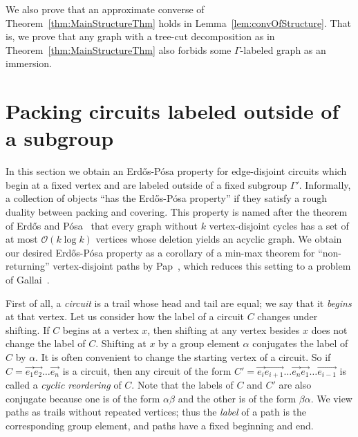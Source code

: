 \documentclass[11pt]{article}
\theoremstyle{definition}
\newcommand{\RMin}[1]{\todo[inline,bordercolor=white,color=DeepCarrotOrange,backgroundcolor=BananaYellow!40,textcolor=DeepCarrotOrange,size=\footnotesize]{\textsf{RM: #1}}}
\newcommand{\CMin}[1]{\todo[inline,bordercolor=white,color=Magenta,backgroundcolor=CornflowerBlue!40,textcolor=black,size=\footnotesize]{\textsf{CM: #1}}}
\begin{document}
We also prove that an approximate converse of Theorem~\ref{thm:MainStructureThm} holds in Lemma~\ref{lem:convOfStructure}. That is, we prove that any graph with a tree-cut decomposition as in Theorem~\ref{thm:MainStructureThm} also forbids some $\Gamma$-labeled graph as an immersion.



\section{Packing circuits labeled outside of a subgroup}
\label{sec:packing}

In this section we obtain an Erd\H{o}s-P\'{o}sa property for edge-disjoint circuits which begin at a fixed vertex and are labeled outside of a fixed subgroup $\Gamma'$. Informally, a collection of objects ``has the Erd\H{o}s-P\'{o}sa property'' if they satisfy a rough duality between packing and covering. This property is named after the theorem of Erd\H{o}s and P\'{o}sa~\cite{EP1965} that every graph without $k$ vertex-disjoint cycles has a set of at most $\mathcal{O}(k \log k)$ vertices whose deletion yields an acyclic graph. We obtain our desired Erd\H{o}s-P\'{o}sa property as a corollary of a min-max theorem for ``non-returning'' vertex-disjoint paths by Pap~\cite{PapAPaths}, which reduces this setting to a problem of Gallai~\cite{Gallai}.

First of all, a \textit{circuit} is a trail whose head and tail are equal; we say that it \emph{begins} at that vertex. Let us consider how the label of a circuit $C$ changes under shifting. If $C$ begins at a vertex $x$, then shifting at any vertex besides $x$ does not change the label of $C$. Shifting at $x$ by a group element $\alpha$ conjugates the label of $C$ by $\alpha$. It is often convenient to change the starting vertex of a circuit. So if $C= \vec{e_1}\vec{e_2} \ldots \vec{e_n}$ is a circuit, then any circuit of the form $C'=\vec{e_i}\vec{e_{i+1}} \ldots \vec{e_n} \vec{e_1} \ldots \vec{e_{i-1}}$ is called a \emph{cyclic reordering} of $C$. Note that the labels of $C$ and $C'$ are also conjugate because one is of the form $\alpha\beta$ and the other is of the form $\beta\alpha$. We view paths as trails without repeated vertices; thus the \emph{label} of a path is the corresponding group element, and paths have a fixed beginning and end.
\end{document}
